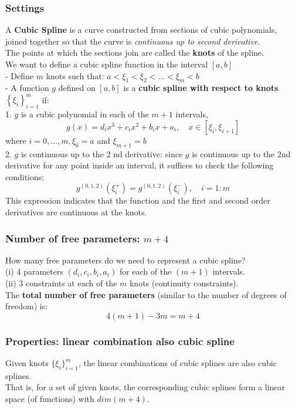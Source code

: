 \documentclass[11pt,a4paper]{article}
\begin{document}
\subsubsection{Settings}
A \textbf{Cubic Spline} is a curve constructed from sections of cubic polynomials, joined together so that the curve is \textit{continuous up to second derivative}.\\
The points at which the sections join are called the \textbf{knots} of the spline.\\

We want to define a cubic spline function in the interval $[a, b]$\\
- Define $m$ knots such that: $a<\xi_{1}<\xi_{2}<\ldots<\xi_{m}<b$\\
- A function $g$ defined on $[a, b]$ is a \textbf{cubic spline with respect to knots $\left\{\xi_{i}\right\}_{i=1}^{m}$} if:\\
1. $g$ is a cubic polynomial in each of the $m+1$ intervals,
$$
g(x)=d_{i} x^{3}+c_{i} x^{2}+b_{i} x+a_{i}, \quad x \in\left[\xi_{i}, \xi_{i+1}\right]
$$
where $i=0, \ldots, m, \xi_{0}=a$ and $\xi_{m+1}=b$\\
2. $g$ is continuous up to the 2 nd derivative: since $g$ is continuous up to the 2nd derivative for any point inside an interval, it suffices to check the following conditions:
$$
g^{(0,1,2)}\left(\xi_{i}^{+}\right)=g^{(0,1,2)}\left(\xi_{i}^{-}\right), \quad i=1: m
$$
This expression indicates that the function and the first and second order derivatives are continuous at the knots.\\

\subsubsection{Number of free parameters: $m+4$}
How many free parameters do we need to represent a cubic spline?\\
(i) 4 parameters $\left(d_{i}, c_{i}, b_{i}, a_{i}\right)$ for each of the $(m+1)$ intervals.\\
(ii) 3 constraints at each of the $m$ knots (continuity constraints).\\
The \textbf{total number of free parameters} (similar to the number of degrees of freedom) is:
$$
4(m+1)-3 m=m+4
$$

\subsubsection{Properties: linear combination also cubic spline}
Given knots $\{\xi_i\}_{i=1}^m$, the linear combinations of cubic splines are also cubic splines.\\
That is, for a set of given knots, the corresponding cubic splines form a linear space (of functions) with ${dim} (m + 4)$.
\end{document}
